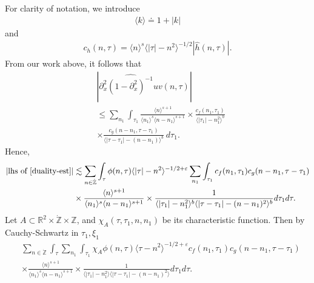 \documentclass[12pt,reqno]{amsart}
\numberwithin{equation}{section}  %
\renewcommand{\cref}{\Cref}
\newcommand{\rr}{\mathbb{R}}
\newcommand{\zz}{\mathbb{Z}}
\newcommand{\zzdot}{\dot{\zz}}
\newcommand{\wh}{\widehat}
\newcommand{\p}{\partial}
\newcommand{\ee}{\varepsilon}
\begin{document}
%
For clarity of notation, we introduce 
%
%
%
\begin{equation*}
\begin{split}
\langle k \rangle \doteq 1 + |k|
\end{split}
\end{equation*}
%
%
and
%
\begin{equation*}
	\begin{split}
		c_h(n, \tau) =
		\langle n \rangle ^s \langle |\tau| - n^{2} \rangle^{-1/2} | \wh{h}\left( n, \tau \right) |.
	\end{split}
\end{equation*}
%
%
From our work above, it follows that 
%
%
\begin{equation}
	\label{convo-est-starting-pnt}
	\begin{split}
		 &  | \wh{\p_{x}^{2}(1 - \p_{x}^{2})^{-1}uv}\left( 
		n, \tau \right) |
		\\
		& \le  
		\sum_{n_{1}} \int_{\tau_{1}} \frac{\langle n \rangle^{s+1}}{\langle n_1 \rangle^s
    \langle n - n_1 \rangle^{s+1}} 
    \times \frac{c_f(n_1, \tau_1)}{\langle |\tau_1| - n_1^{2} \rangle^{b}}
		\\
		& \times
		\frac{c_g(n - n_1, \tau - \tau_1 )}{\langle |\tau - \tau_1| - (n - n_1)
		\rangle^{b}}\ d \tau_1.
	\end{split}
\end{equation}
%
%
Hence, 
%
%
\begin{equation}
  \label{pre-fubini-int-form}
	\begin{split}
    |\text{lhs of} \ \cref{duality-est}|
    & \lesssim \sum_{n \in \zzdot} \int_{\tau} \phi(n, \tau)\langle | \tau | - n^{2} \rangle^{-1/2+\ee}  
  \sum_{n_{1}}
  \int_{\tau_{1}} c_f(n_1, \tau_1)
		c_g(n - n_1, \tau - \tau_1 )
		\\
    & \times \frac{\langle n \rangle ^{s+1}}{\langle n_{1} \rangle ^{s} \langle
    n-n_{1} \rangle ^{s+1}} \times \frac{1}{\langle |\tau_{1}|-n_{1}^{2} \rangle^{b}\langle | \tau -
    \tau_{1}|-(n - n_{1})^{2}
    \rangle^{b}} d \tau_1 d \tau.
	\end{split}
\end{equation}
%
%
%
Let $A \subset \rr^{2} \times \zzdot \times \zz$, and $\chi_{A}(\tau, \tau_{1}, n, n_{1})$
be its
characteristic function. Then by Cauchy-Schwartz in
$\tau_{1}, \xi_{1}$
\begin{equation*}
	\begin{split}
    & \sum_{n \in \zzdot} \int_{\tau}   \sum_{n_{1}}
    \int_{\tau_{1}} \chi_{A}
    \phi(n, \tau)  \langle \tau - n^{2} \rangle^{-1/2+\ee}
  c_f(n_1, \tau_1)
		c_g(n - n_1, \tau - \tau_1 )
		\\
    & \times 
    \frac{\langle n \rangle ^{s+1}}{\langle n_{1} \rangle ^{s} \langle
    n-n_{1} \rangle ^{s+1}} 
    \times \frac{1}{\langle |\tau_{1}|-n_{1}^{2} \rangle\langle | \tau -
    \tau_{1}|-(n - n_{1})^{2}
    \rangle} d \tau_1 d \tau.
	\end{split}
\end{equation*}
\end{document}
